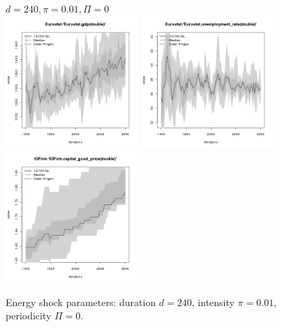\begin{figure}[ht!]
\centering\leavevmode
\begin{minipage}{17cm}
\centering\leavevmode
{$d=240, \pi=0.01, \Pi=0$}\\
\includegraphics[width=5cm]{./energy_shock/png/duration_240/intensity_0.01/frequency_0/Eurostat-gdp.png}
\includegraphics[width=5cm]{./energy_shock/png/duration_240/intensity_0.01/frequency_0/Eurostat-unemployment_rate.png}
\includegraphics[width=5cm]{./energy_shock/png/duration_240/intensity_0.01/frequency_0/IGFirm-capital_good_price.png}
\end{minipage}
\caption{Energy shock parameters: duration $d=240$, intensity $\pi=0.01$, periodicity $\Pi=0$.}
\label{Figure: energy shock 1}
\end{figure}

